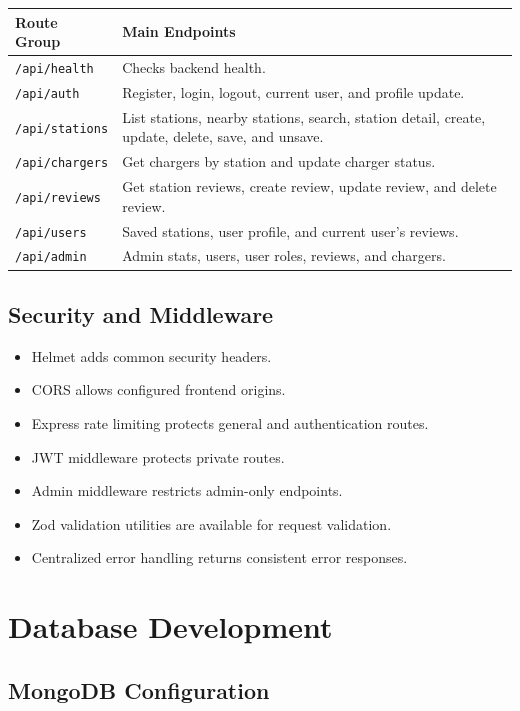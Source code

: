 \documentclass[12pt,a4paper]{article}
\begin{document}
\begin{longtable}{p{4cm}p{10cm}}
\toprule
\textbf{Route Group} & \textbf{Main Endpoints} \\
\midrule
\texttt{/api/health} & Checks backend health. \\
\texttt{/api/auth} & Register, login, logout, current user, and profile update. \\
\texttt{/api/stations} & List stations, nearby stations, search, station detail, create, update, delete, save, and unsave. \\
\texttt{/api/chargers} & Get chargers by station and update charger status. \\
\texttt{/api/reviews} & Get station reviews, create review, update review, and delete review. \\
\texttt{/api/users} & Saved stations, user profile, and current user's reviews. \\
\texttt{/api/admin} & Admin stats, users, user roles, reviews, and chargers. \\
\bottomrule
\end{longtable}

\subsection{Security and Middleware}

\begin{itemize}
  \item Helmet adds common security headers.
  \item CORS allows configured frontend origins.
  \item Express rate limiting protects general and authentication routes.
  \item JWT middleware protects private routes.
  \item Admin middleware restricts admin-only endpoints.
  \item Zod validation utilities are available for request validation.
  \item Centralized error handling returns consistent error responses.
\end{itemize}

\section{Database Development}

\subsection{MongoDB Configuration}
\end{document}
